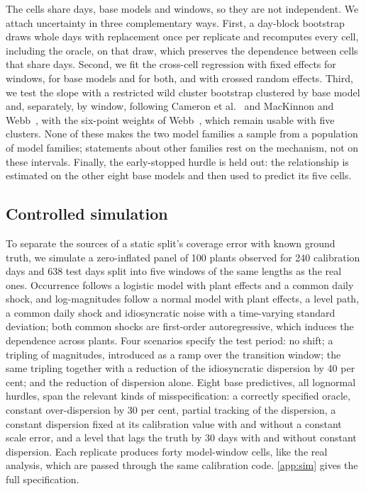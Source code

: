 The cells share days, base models and windows, so they are not independent. We attach uncertainty in three complementary ways. First, a day-block bootstrap draws whole days with replacement once per replicate and recomputes every cell, including the oracle, on that draw, which preserves the dependence between cells that share days. Second, we fit the cross-cell regression with fixed effects for windows, for base models and for both, and with crossed random effects. Third, we test the slope with a restricted wild cluster bootstrap clustered by base model and, separately, by window, following Cameron et al.~\cite{cameron2008} and MacKinnon and Webb~\cite{mackinnon2017}, with the six-point weights of Webb~\cite{webb2023}, which remain usable with five clusters. None of these makes the two model families a sample from a population of model families; statements about other families rest on the mechanism, not on these intervals. Finally, the early-stopped hurdle is held out: the relationship is estimated on the other eight base models and then used to predict its five cells.

\subsection{Controlled simulation}
\label{sec:simdesign}

To separate the sources of a static split's coverage error with known ground truth, we simulate a zero-inflated panel of 100 plants observed for 240 calibration days and 638 test days split into five windows of the same lengths as the real ones. Occurrence follows a logistic model with plant effects and a common daily shock, and log-magnitudes follow a normal model with plant effects, a level path, a common daily shock and idiosyncratic noise with a time-varying standard deviation; both common shocks are first-order autoregressive, which induces the dependence across plants. Four scenarios specify the test period: no shift; a tripling of magnitudes, introduced as a ramp over the transition window; the same tripling together with a reduction of the idiosyncratic dispersion by 40 per cent; and the reduction of dispersion alone. Eight base predictives, all lognormal hurdles, span the relevant kinds of misspecification: a correctly specified oracle, constant over-dispersion by 30 per cent, partial tracking of the dispersion, a constant dispersion fixed at its calibration value with and without a constant scale error, and a level that lags the truth by 30 days with and without constant dispersion. Each replicate produces forty model-window cells, like the real analysis, which are passed through the same calibration code. \ref{app:sim} gives the full specification.
